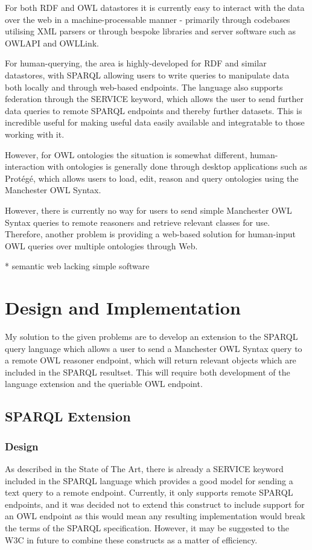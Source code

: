 \documentclass{article}
\begin{document}
For both RDF and OWL datastores it is currently easy to interact with the data
over the web in a machine-processable manner - primarily through codebases
utilising XML parsers or through bespoke libraries and server software such as 
OWLAPI and OWLLink.

For human-querying, the area is highly-developed for RDF and similar datastores, 
with SPARQL allowing users to write queries to manipulate data both locally and
through web-based endpoints. The language also supports federation through the
SERVICE keyword, which allows the user to send further data queries to remote
SPARQL endpoints and thereby further datasets. This is incredible useful for
making useful data easily available and integratable to those working with it.

However, for OWL ontologies the situation is somewhat different,
human-interaction with ontologies is generally done through desktop applications
such as Protégé, which allows users to load, edit, reason and query ontologies 
using the Manchester OWL Syntax.

However, there is currently no way for users to send simple Manchester OWL
Syntax queries to remote reasoners and retrieve relevant classes for use. 
Therefore, another problem is providing a web-based solution for human-input OWL
queries over multiple ontologies through Web. 

* semantic web lacking simple software

\section{Design and Implementation}

My solution to the given problems are to develop an extension to the SPARQL
query language which allows a user to send a Manchester OWL Syntax query to a
remote OWL reasoner endpoint, which will return relevant objects which are
included in the SPARQL resultset. This will require both development of the
language extension and the queriable OWL endpoint.

\subsection{SPARQL Extension}

\subsubsection{Design}

As described in the State of The Art, there is already a SERVICE keyword
included in the SPARQL language which provides a good model for sending a text
query to a remote endpoint. Currently, it only supports remote SPARQL endpoints,
and it was decided not to extend this construct to include support for an OWL
endpoint as this would mean any resulting implementation would break the terms
of the SPARQL specification. However, it may be suggested to the W3C in future
to combine these constructs as a matter of efficiency. 
\end{document}

